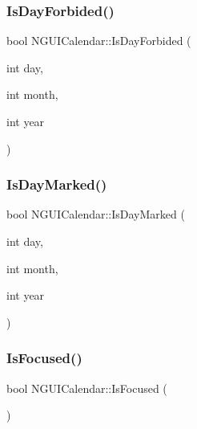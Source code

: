 \subsubsection{\texorpdfstring{Is\+Day\+Forbided()}{IsDayForbided()}}
{\footnotesize\ttfamily bool N\+G\+U\+I\+Calendar\+::\+Is\+Day\+Forbided (\begin{DoxyParamCaption}\item[{int}]{day,  }\item[{int}]{month,  }\item[{int}]{year }\end{DoxyParamCaption})}

\hypertarget{class_n_g_u_i_calendar_aacea596c42008d27899da2b7efb88c50}{}\label{class_n_g_u_i_calendar_aacea596c42008d27899da2b7efb88c50} 
\subsubsection{\texorpdfstring{Is\+Day\+Marked()}{IsDayMarked()}}
{\footnotesize\ttfamily bool N\+G\+U\+I\+Calendar\+::\+Is\+Day\+Marked (\begin{DoxyParamCaption}\item[{int}]{day,  }\item[{int}]{month,  }\item[{int}]{year }\end{DoxyParamCaption})}

\hypertarget{class_n_g_u_i_calendar_a296fe0815562d0660418dc64a2b872e7}{}\label{class_n_g_u_i_calendar_a296fe0815562d0660418dc64a2b872e7} 
\subsubsection{\texorpdfstring{Is\+Focused()}{IsFocused()}}
{\footnotesize\ttfamily bool N\+G\+U\+I\+Calendar\+::\+Is\+Focused (\begin{DoxyParamCaption}{ }\end{DoxyParamCaption})}

\hypertarget{class_n_g_u_i_calendar_a4c26f3e403f88f628f71bd5010b6dbe0}{}\label{class_n_g_u_i_calendar_a4c26f3e403f88f628f71bd5010b6dbe0} 
